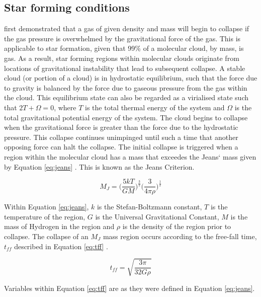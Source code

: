 \documentclass{report}
\begin{document}
\subsection{Star forming conditions} \label{sec:conditions}
\textcite{jeans} first demonstrated that a gas of given density and mass will begin to collapse if the gas pressure is overwhelmed by the gravitational force of the gas. This is applicable to star formation, given that 99\% of a molecular cloud, by mass, is gas. As a result, star forming regions within molecular clouds originate from locations of gravitational instability that lead to subsequent collapse. A stable cloud (or portion of a cloud) is in hydrostatic equilibrium, such that the force due to gravity is balanced by the force due to gaseous pressure from the gas within the cloud. This equilibrium state can also be regarded as a virialised state such that $2T+\Omega=0$, where $T$ is the total thermal energy of the system and $\Omega$ is the total gravitational potential energy of the system. The cloud begins to collapse when the gravitational force is greater than the force due to the hydrostatic pressure. This collapse continues unimpinged until such a time that another opposing force can halt the collapse. The initial collapse is triggered when a region within the molecular cloud has a mass that exceedes the Jeans` mass given by Equation \ref{eq:jeans} \parencite{lecture}. This is known as the Jeans Criterion.

\begin{equation}\label{eq:jeans}
  M_{J} = \Bigg( \frac{5kT}{GM} \Bigg )^\frac{3}{2} \Bigg( \frac{3}{4\pi\rho} \Bigg )^\frac{1}{2}
\end{equation}

Within Equation \ref{eq:jeans}, $k$ is the Stefan-Boltzmann constant, $T$ is the temperature of the region, $G$ is the Universal Gravitational Constant, $M$ is the mass of Hydrogen in the region and $\rho$ is the density of the region prior to collapse. The collapse of an $M_{J}$ mass region occurs according to the free-fall time, $t_{ff}$ described in Equation \ref{eq:tff} \parencite{jeans}.

\begin{equation}\label{eq:tff}
  t_{ff} = \sqrt{\frac{3\pi}{32G\rho}}
\end{equation}

Variables within Equation \ref{eq:tff} are as they were defined in Equation \ref{eq:jeans}.
\end{document}

